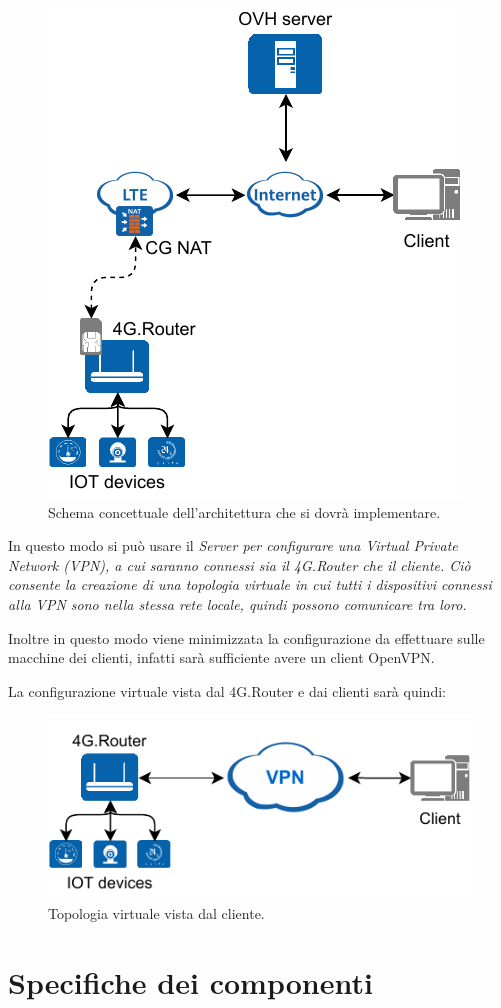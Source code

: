 \begin{figure}[H]
	\centering
	\includegraphics[width=0.5\linewidth]{immagini/diag-real}
	\caption{Schema concettuale dell'architettura che si dovrà implementare.}
	\label{fig:schem_architettura_reale}
\end{figure}

In questo modo si può usare il \it{Server} per configurare una \it{Virtual Private Network} (VPN), a cui saranno connessi sia il \it{4G.Router} che il cliente. Ciò consente la creazione di una topologia virtuale in cui tutti i dispositivi connessi alla VPN sono nella stessa rete locale, quindi possono comunicare tra loro.

Inoltre in questo modo viene minimizzata la configurazione da effettuare sulle macchine dei clienti, infatti sarà sufficiente avere un client OpenVPN.

La configurazione virtuale vista dal 4G.Router e dai clienti sarà quindi:

\begin{figure}[H]
	\centering
	\includegraphics[width=0.5\linewidth]{immagini/diag-virtual}
	\caption{Topologia virtuale vista dal cliente.}
	\label{fig:schema_architettura_virtuale}
\end{figure}

\section{Specifiche dei componenti}

